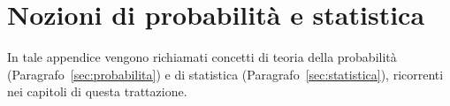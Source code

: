 \chapter{Nozioni di probabilità e statistica}\label{appendix:probability_statistics}

In tale appendice vengono richiamati concetti di teoria della probabilità (Paragrafo~\ref{sec:probabilita}) 
e di statistica (Paragrafo~\ref{sec:statistica}), ricorrenti nei capitoli di questa trattazione.







